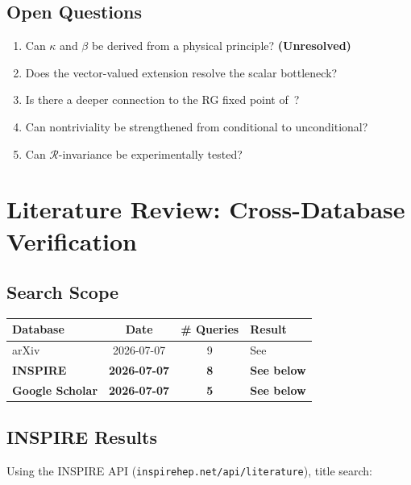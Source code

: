 \documentclass[11pt,a4paper]{article}
\theoremstyle{remark}
\newcommand{\R}{\mathcal{R}}
\begin{document}
\subsection{Open Questions}

\begin{enumerate}
  \item Can $\kappa$ and $\beta$ be derived from a physical principle? \textbf{(Unresolved)}
  \item Does the vector-valued extension resolve the scalar bottleneck?
  \item Is there a deeper connection to the RG fixed point of~\cite{Per20}?
  \item Can nontriviality be strengthened from conditional to unconditional?
  \item Can $\R$-invariance be experimentally tested?
\end{enumerate}

\section{Literature Review: Cross-Database Verification}

\subsection{Search Scope}

\begin{table}[h]
\centering
\begin{tabular}{lccl}
\toprule
Database & Date & \# Queries & Result \\
\midrule
arXiv & 2026-07-07 & 9 & See~\cite{Phase1Report} \\
\textbf{INSPIRE} & \textbf{2026-07-07} & \textbf{8} & \textbf{See below} \\
\textbf{Google Scholar} & \textbf{2026-07-07} & \textbf{5} & \textbf{See below} \\
\bottomrule
\end{tabular}
\end{table}

\subsection{INSPIRE Results}

Using the INSPIRE API (\texttt{inspirehep.net/api/literature}), title search:
\end{document}

